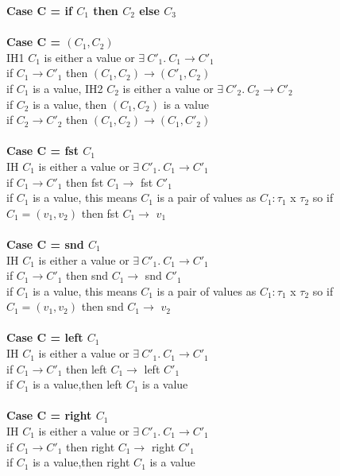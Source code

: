 \documentclass{article}
\begin{document}
\textbf{Case C = if $C_1$ then $C_2$ else $C_3$} \\


\\

\textbf{Case C = $(C_1,C_2)$} \\
IH1 $C_1$ is either a value or $  \exists \ C'_1.\ C_1 \to C'_1 $ \\
if $C_1 \to C'_1$ then $(C_1,C_2) \to (C'_1, C_2)$\\
if $C_1$ is a value, IH2 $C_2$ is either a value or $  \exists \ C'_2.\ C_2 \to C'_2 $ \\
if $C_2$ is a value, then $(C_1,C_2)$ is a value \\
if $C_2 \to C'_2$ then $(C_1,C_2) \to (C_1,C'_2)$ \\ \\
\textbf{Case C = fst $C_1$} \\
IH $C_1$ is either a value or $  \exists \ C'_1.\ C_1 \to C'_1 $ \\
if $C_1 \to C'_1$ then fst $C_1 \to$ fst $C'_1$\\
if $C_1$ is a value, this means $C_1$ is a pair of values as $C_1: \tau_1$ x $\tau_2$
 so if $C_1 = (v_1, v_2)$ then fst $C_1 \to$ $v_1$\\ \\
\textbf{Case C = snd $C_1$} \\
IH $C_1$ is either a value or $  \exists \ C'_1.\ C_1 \to C'_1 $ \\
if $C_1 \to C'_1$ then snd $C_1 \to$ snd $C'_1$\\
if $C_1$ is a value, this means $C_1$ is a pair of values as $C_1: \tau_1$ x $\tau_2$
 so if $C_1 = (v_1, v_2)$ then snd $C_1 \to$ $v_2$\\ \\
\textbf{Case C = left $C_1$} \\
IH $C_1$ is either a value or $  \exists \ C'_1.\ C_1 \to C'_1 $ \\
if $C_1 \to C'_1$ then left $C_1 \to$ left $C'_1$\\
if $C_1$ is a value,then left $C_1$ is a value\\ \\
\textbf{Case C = right $C_1$} \\
IH $C_1$ is either a value or $  \exists \ C'_1.\ C_1 \to C'_1 $ \\
if $C_1 \to C'_1$ then right $C_1 \to$ right $C'_1$\\
if $C_1$ is a value,then right $C_1$ is a value\\ \\
\end{document}
